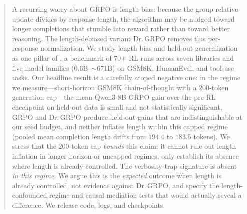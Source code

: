 \begin{abstract}
A recurring worry about GRPO is length bias: because the group-relative update
divides by response length, the algorithm may be nudged toward longer completions
that stumble into reward rather than toward better reasoning. The length-debiased
variant Dr.\,GRPO removes this per-response normalization. We study length bias and
held-out generalization as one pillar of \ours{}, a benchmark of 70+ RL runs across
seven libraries and five model families ($0.6$B--$\sim$671B) on GSM8K, HumanEval,
and tool-use tasks. Our headline result is a carefully scoped negative one: in the
regime we measure---short-horizon GSM8K chain-of-thought with a 200-token
generation cap---the mean Qwen3-8B GRPO
gain over the pre-RL checkpoint on held-out data is small and not statistically
significant, GRPO and Dr.\,GRPO produce held-out gains that are indistinguishable
at our seed budget, and neither inflates length within this capped regime (pooled
mean completion length drifts from $194.4$ to $183.5$ tokens). We stress that the
$200$-token cap \emph{bounds} this claim: it cannot rule out length inflation in
longer-horizon or uncapped regimes, only establish its absence where length is
already controlled. The verbosity-trap signature is absent \emph{in this regime}. We argue this is the
\emph{expected} outcome when length is already controlled, not evidence against
Dr.\,GRPO, and specify the length-confounded regime and causal mediation tests that
would actually reveal a difference. We release code, logs, and checkpoints.
\end{abstract}
